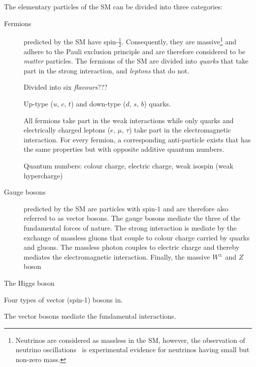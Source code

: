 The elementary particles of the SM can be divided into three categories:
\begin{description}

\item[Fermions] predicted by the SM have spin-$\frac{1}{2}$. Consequently, they
  are massive\footnote{Neutrinos are considered as massless in the SM, however,
    the observation of neutrino
    oscillations~\cite{Super-Kamiokande:1998kpq,SNO:2002tuh} is experimental
    evidence for neutrinos having small but non-zero mass.} and adhere to the
  Pauli exclusion principle and are therefore considered to be \emph{matter}
  particles. The fermions of the SM are divided into \emph{quarks} that take
  part in the strong interaction, and \emph{leptons} that do not.

  Divided into six \emph{flavours}???

  Up-type ($u$, $c$, $t$) and down-type ($d$, $s$, $b$) quarks.

  All fermions take part in the weak interactions while only quarks and
  electrically charged leptons ($e$, $\mu$, $\tau$) take part in the
  electromagnetic interaction. For every fermion, a corresponding anti-particle
  exists that has the same properties but with opposite additive quantum
  numbers.



  Quantum numbers: colour charge, electric charge, weak isospin (weak hypercharge)

\item[Gauge bosons] predicted by the SM are particles with spin-$1$ and are
  therefore also referred to as vector bosons. The gauge bosons mediate the
  three of the fundamental forces of nature. The strong interaction is mediate
  by the exchange of massless gluons that couple to colour charge carried by
  quarks and gluons. The massless photon couples to electric charge and thereby
  mediates the electromagnetic interaction. Finally, the massive $W^\pm$ and $Z$
  boson

\item[The Higgs boson]

\end{description}


Four types of vector (spin-1) bosons in.

The vector bosons mediate the fundamental interactions.

